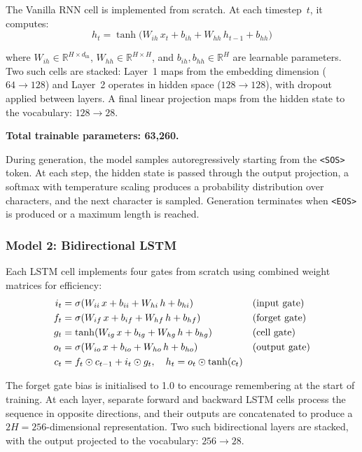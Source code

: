 \documentclass[12pt, a4paper]{article}
\begin{document}
The Vanilla RNN cell is implemented from scratch. At each timestep~$t$, it computes:
\begin{equation}
  h_t = \tanh\!\bigl(W_{ih}\, x_t + b_{ih} + W_{hh}\, h_{t-1} + b_{hh}\bigr)
\end{equation}

where $W_{ih} \in \mathbb{R}^{H \times d_{\mathrm{in}}}$, $W_{hh} \in \mathbb{R}^{H \times H}$, and $b_{ih}, b_{hh} \in \mathbb{R}^{H}$ are learnable parameters. Two such cells are stacked: Layer~1 maps from the embedding dimension ($64 \to 128$) and Layer~2 operates in hidden space ($128 \to 128$), with dropout applied between layers. A final linear projection maps from the hidden state to the vocabulary: $128 \to 28$.

\textbf{Total trainable parameters: 63,260.}

During generation, the model samples autoregressively starting from the \texttt{<SOS>} token. At each step, the hidden state is passed through the output projection, a softmax with temperature scaling produces a probability distribution over characters, and the next character is sampled. Generation terminates when \texttt{<EOS>} is produced or a maximum length is reached.

\subsubsection{Model 2: Bidirectional LSTM}

Each LSTM cell implements four gates from scratch using combined weight matrices for efficiency:
\begin{align}
  i_t &= \sigma(W_{ii}\, x + b_{ii} + W_{hi}\, h + b_{hi}) & &\text{(input gate)} \\
  f_t &= \sigma(W_{if}\, x + b_{if} + W_{hf}\, h + b_{hf}) & &\text{(forget gate)} \\
  g_t &= \tanh(W_{ig}\, x + b_{ig} + W_{hg}\, h + b_{hg}) & &\text{(cell gate)} \\
  o_t &= \sigma(W_{io}\, x + b_{io} + W_{ho}\, h + b_{ho}) & &\text{(output gate)} \\
  c_t &= f_t \odot c_{t-1} + i_t \odot g_t, \quad h_t = o_t \odot \tanh(c_t) \notag
\end{align}

The forget gate bias is initialised to 1.0 to encourage remembering at the start of training. At each layer, separate forward and backward LSTM cells process the sequence in opposite directions, and their outputs are concatenated to produce a $2H = 256$-dimensional representation. Two such bidirectional layers are stacked, with the output projected to the vocabulary: $256 \to 28$.
\end{document}
